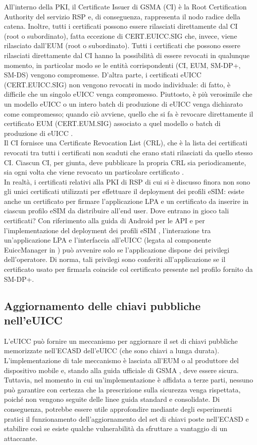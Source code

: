 \documentclass[10pt, oneside]{book}
\begin{document}
All'interno della PKI, il Certificate Issuer di GSMA (CI) è la Root Certification Authority del servizio RSP e, di conseguenza, rappresenta il nodo radice della catena. Inoltre, tutti i certificati possono essere rilasciati direttamente dal CI (root o subordinato), fatta eccezione di CERT.EUICC.SIG che, invece, viene rilasciato dall'EUM (root o subordinato). Tutti i certificati che possono essere rilasciati direttamente dal CI hanno la possibilità di essere revocati in qualunque momento, in particolar modo se le entità corrispondenti (CI, EUM, SM-DP+, SM-DS) vengono compromesse. D'altra parte, i certificati eUICC (CERT.EUICC.SIG) non vengono revocati in modo individuale: di fatto, è difficile che un singolo eUICC venga compromesso. Piuttosto, è più verosimile che un modello eUICC o un intero batch di produzione di eUICC venga dichiarato come compromesso; quando ciò avviene, quello che si fa è revocare direttamente il certificato EUM (CERT.EUM.SIG) associato a quel modello o batch di produzione di eUICC \cite{GSMA-docs-new}.\\
Il CI fornisce una Certificate Revocation List (CRL), che è la lista dei certificati revocati tra tutti i certificati non scaduti che erano stati rilasciati da quello stesso CI. Ciascun CI, per giunta, deve pubblicare la propria CRL sia periodicamente, sia ogni volta che viene revocato un particolare certificato \cite{GSMA-docs-new}.\\
In realtà, i certificati relativi alla PKI di RSP di cui si è discusso finora non sono gli unici certificati utilizzati per effettuare il deployment dei profili eSIM: esiste anche un certificato per firmare l'applicazione LPA e un certificato da inserire in ciascun profilo eSIM da distribuire all'end user. Dove entrano in gioco tali certificati? Con riferimento alla guida di Android per le API e per l'implementazione del deployment dei profili eSIM \cite{Android-docs}, l'interazione tra un'applicazione LPA e l'interfaccia all'eUICC (legata al componente EuiccManager in \cite{Android-docs}) può avvenire solo se l'applicazione dispone dei privilegi dell'operatore. Di norma, tali privilegi sono conferiti all'applicazione se il certificato usato per firmarla coincide col certificato presente nel profilo fornito da SM-DP+.

\subsection{Aggiornamento delle chiavi pubbliche nell'eUICC}
L'eUICC può fornire un meccanismo per aggiornare il set di chiavi pubbliche memorizzate nell'ECASD dell'eUICC (che sono chiavi a lunga durata). L'implementazione di tale meccanismo è lasciata all'EUM o al produttore del dispositivo mobile e, stando alla guida ufficiale di GSMA \cite{GSMA-docs-new}, deve essere sicura. Tuttavia, nel momento in cui un'implementazione è affidata a terze parti, nessuno può garantire con certezza che la prescrizione sulla sicurezza venga rispettata, poiché non vengono seguite delle linee guida standard e consolidate. Di conseguenza, potrebbe essere utile approfondire mediante degli esperimenti pratici il funzionamento dell'aggiornamento del set di chiavi poste nell'ECASD e stabilire così se esiste qualche vulnerabilità da sfruttare a vantaggio di un attaccante.
\end{document}
